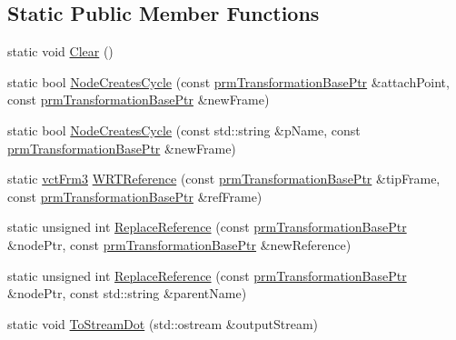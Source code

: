 \subsection*{Static Public Member Functions}
\begin{DoxyCompactItemize}
\item 
static void \hyperlink{classprm_transformation_manager_a528d7436d10bd51c9372303d44de08c6}{Clear} ()
\item 
static bool \hyperlink{classprm_transformation_manager_ae65877c7ac5cdfd00a584235b195bc46}{Node\-Creates\-Cycle} (const \hyperlink{prm_transformation_base_8h_a881a6a7d2191474974cdf36d79e1df08}{prm\-Transformation\-Base\-Ptr} \&attach\-Point, const \hyperlink{prm_transformation_base_8h_a881a6a7d2191474974cdf36d79e1df08}{prm\-Transformation\-Base\-Ptr} \&new\-Frame)
\item 
static bool \hyperlink{classprm_transformation_manager_ab21322d7f13ee4a88ce018539115267e}{Node\-Creates\-Cycle} (const std\-::string \&p\-Name, const \hyperlink{prm_transformation_base_8h_a881a6a7d2191474974cdf36d79e1df08}{prm\-Transformation\-Base\-Ptr} \&new\-Frame)
\item 
static \hyperlink{vct_transformation_types_8h_a81feda0a02c2d1bc26e5553f409fed20}{vct\-Frm3} \hyperlink{classprm_transformation_manager_a70706b6cb21dcd9fd6473a0d743e5ab3}{W\-R\-T\-Reference} (const \hyperlink{prm_transformation_base_8h_a881a6a7d2191474974cdf36d79e1df08}{prm\-Transformation\-Base\-Ptr} \&tip\-Frame, const \hyperlink{prm_transformation_base_8h_a881a6a7d2191474974cdf36d79e1df08}{prm\-Transformation\-Base\-Ptr} \&ref\-Frame)
\item 
static unsigned int \hyperlink{classprm_transformation_manager_a1ca6a4b49e0e1a7f649d82ffe58fad6c}{Replace\-Reference} (const \hyperlink{prm_transformation_base_8h_a881a6a7d2191474974cdf36d79e1df08}{prm\-Transformation\-Base\-Ptr} \&node\-Ptr, const \hyperlink{prm_transformation_base_8h_a881a6a7d2191474974cdf36d79e1df08}{prm\-Transformation\-Base\-Ptr} \&new\-Reference)
\item 
static unsigned int \hyperlink{classprm_transformation_manager_a4273afd47937e7e8e292f7b330d357d7}{Replace\-Reference} (const \hyperlink{prm_transformation_base_8h_a881a6a7d2191474974cdf36d79e1df08}{prm\-Transformation\-Base\-Ptr} \&node\-Ptr, const std\-::string \&parent\-Name)
\item 
static void \hyperlink{classprm_transformation_manager_a4c349fc7be9a84e703103cf1e0757c66}{To\-Stream\-Dot} (std\-::ostream \&output\-Stream)
\item 

\end{DoxyCompactItemize}
